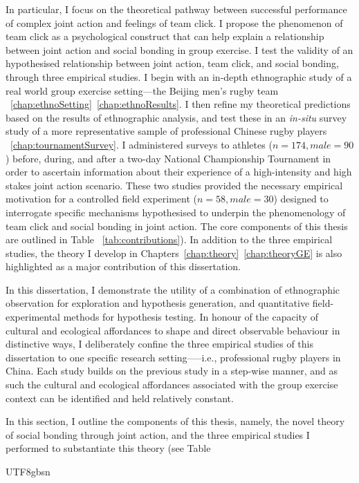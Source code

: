 \begin{CJK}{UTF8}{gbsn}
In particular, I focus on the theoretical pathway between successful performance of complex joint action and feelings of team click.  I propose the phenomenon of team click as a psychological construct that can help explain a relationship between joint action and social bonding in group exercise.  I test the validity of an hypothesised relationship between joint action, team click, and social bonding, through three empirical studies.  I begin with an in-depth ethnographic study of a real world group exercise setting---the Beijing men's rugby team ~\ref{chap:ethnoSetting}\nobreakdash~\ref{chap:ethnoResults}.  I then refine my theoretical predictions based on the results of ethnographic analysis, and test these in an \textit{in-situ} survey study of a more representative sample of professional Chinese rugby players ~\ref{chap:tournamentSurvey}. I administered surveys to athletes ($n = 174, male = 90$) before, during, and after a two-day National Championship Tournament in order to ascertain information about their experience of a high-intensity and high stakes joint action scenario.  These two studies provided the necessary empirical motivation for a controlled field experiment ($n = 58, male = 30$) designed to interrogate specific mechanisms hypothesised to underpin the phenomenology of team click and social bonding in joint action.  The core components of this thesis are outlined in Table  ~\ref{tab:contributions}).  In addition to the three empirical studies, the theory I develop in Chapters~\ref{chap:theory}\nobreakdash~\ref{chap:theoryGE} is also highlighted as a major contribution of this dissertation.  



In this dissertation, I demonstrate the utility of a combination of ethnographic observation for exploration and hypothesis generation, and quantitative field-experimental methods for hypothesis testing. In honour of the capacity of cultural and ecological affordances to shape and direct observable behaviour in distinctive ways, I deliberately confine the three empirical studies of this dissertation to one specific research setting—--i.e., professional rugby players in China.
Each study builds on the previous study in a step-wise manner, and as such the cultural and ecological affordances associated with the group exercise context can be identified and held relatively constant.


In this section, I outline the components of this thesis, namely, the novel theory of social bonding through joint action, and the three empirical studies I performed to substantiate this theory (see Table



\end{CJK}{UTF8}{gbsn}
